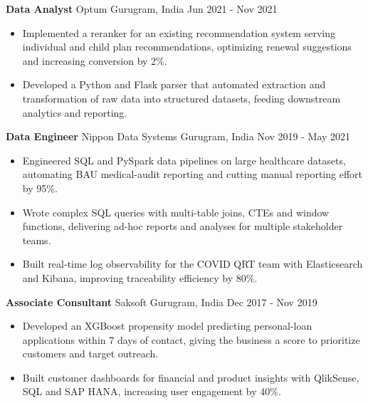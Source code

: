 \documentclass[10pt,a4paper]{article}
\newcommand{\role}[4]{\textbf{#1} \textbar{} #2 \hfill #3 \textbar{} #4\par}
\begin{document}
\vspace{3pt}
\role{Data Analyst}{Optum}{Gurugram, India}{Jun 2021 - Nov 2021}
\begin{itemize}
  \item Implemented a reranker for an existing recommendation system serving individual and child plan recommendations, optimizing renewal suggestions and increasing conversion by 2\%.
  \item Developed a Python and Flask parser that automated extraction and transformation of raw data into structured datasets, feeding downstream analytics and reporting.
\end{itemize}
\vspace{3pt}
\role{Data Engineer}{Nippon Data Systems}{Gurugram, India}{Nov 2019 - May 2021}
\begin{itemize}
  \item Engineered SQL and PySpark data pipelines on large healthcare datasets, automating BAU medical-audit reporting and cutting manual reporting effort by 95\%.
  \item Wrote complex SQL queries with multi-table joins, CTEs and window functions, delivering ad-hoc reports and analyses for multiple stakeholder teams.
  \item Built real-time log observability for the COVID QRT team with Elasticsearch and Kibana, improving traceability efficiency by 80\%.
\end{itemize}
\vspace{3pt}
\role{Associate Consultant}{Saksoft}{Gurugram, India}{Dec 2017 - Nov 2019}
\begin{itemize}
  \item Developed an XGBoost propensity model predicting personal-loan applications within 7 days of contact, giving the business a score to prioritize customers and target outreach.
  \item Built customer dashboards for financial and product insights with QlikSense, SQL and SAP HANA, increasing user engagement by 40\%.
\end{itemize}
\end{document}
